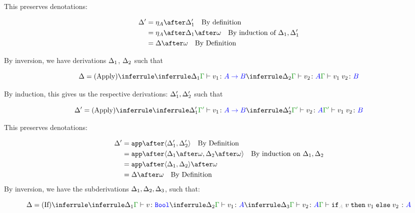 \documentclass{report}
\begin{document}
This preserves denotations:

\begin{align}
    \D' & = \point{A}\after\D_1' \qt{By definition}\\
        & = \point{A}\after\D_1\after\w\qt{By induction of $\D_1, \D_1'$}\\
        & = \D\after\w\qt{By Definition}
\end{align}

    By inversion, we have derivations $\Delta_1$, $\Delta_2$ such that

    \begin{equation}
        \D = 
        \ntreeruleII{Apply}{
            \treeruleI{\D_1}{\gtyperelation{v_1}{\ab}}
            }{
            \treeruleI{\D_2}{\gtyperelation{v_2}{A}}
        } {
            \gtyperelation{\apply{v_1}{v_2}}{B}
        }
    \end{equation}

    By induction, this gives us the respective derivations: $\Delta_1',\Delta_2'$ such that

    
    \begin{equation}
        \D' = 
        \ntreeruleII{Apply}{
            \treeruleI{\D_1'}{\typerelation{\G'}{v_1}{\ab}}
            }{
            \treeruleI{\D_2'}{\typerelation{\G'}{v_2}{A}}
        } {
            \typerelation{\G'}{\apply{v_1}{v_2}}{B}
        }
    \end{equation}

    This preserves denotations:

    \begin{align}
        \D' &= \app\after\pr{\D_1'}{\D_2'} \qt{By Definition}\\
        &= \app\after\pr{\D_1\after\w}{\D_2\after\w} \qt{By induction on $\D_1, \D_2$}\\
        &= \app\after\pr{\D_1}{\D_2}\after\w\\
        &= \D\after\w\qt{By Definition}
    \end{align}
By inversion, we have the subderivations $\Delta_1,\Delta_2,\Delta_3$, such that:


\begin{equation}
    \D = \ntreeruleIII{If}{
        \treeruleI{\D_1}{\typerelation{\G}{v}{\B}}
        }{
        \treeruleI{\D_2}{\typerelation{\G}{v_1}{ A}}
        }{
        \treeruleI{\D_3}{\typerelation{\G}{v_2}{ A}}
    }{
        \typerelation{\G}{\pifthenelse{A}{v}{v_1}{v_2}}{ A}
    }
\end{equation}
\end{document}
